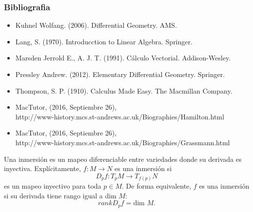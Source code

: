\documentclass[spanish]{beamer}
\begin{document}
\begin{frame}
    \frametitle{Bibliografia}
    \begin{itemize}
    \item Kuhnel Wolfang. (2006). Differential Geometry. AMS.
    \item Lang, S. (1970). Introducction to Linear Algebra. Springer. 
    \item Marsden Jerrold E., A. J. T. (1991). Cálculo Vectorial. Addison-Wesley. 
    \item Pressley Andrew. (2012). Elementary Differential Geometry. Springer. 
    \item Thompson, S. P. (1910). Calculus Made Easy. The Macmillan Company. 
    \item MacTutor, (2016, Septiembre 26), \\  http://www-history.mcs.st-andrews.ac.uk/Biographies/Hamilton.html
    \item MacTutor, (2016, Septiembre 26), \\ http://www-history.mcs.st-andrews.ac.uk/Biographies/Grassmann.html
    \end{itemize}
    \end{frame}

\begin{frame}
    \begin{definition}\label{def:immersion}
        Una inmersi\'on es un mapeo diferenciable entre variedades donde su
        derivada es inyectiva. Expl\'icitamente, $f:M \rightarrow N$ es una inmersi\'on si
        $$ D_{p}f: T_{p}M \rightarrow T_{f(p)}N $$
        es un mapeo inyectivo para toda $p \in M$. De forma equivalente, $f$ es una inmersi\'on
        si su derivada tiene rango igual a dim $M$:
        $$ rank D_{p}f = \text{dim }M \text{.} $$
    \end{definition}
\end{frame}
\end{document}
